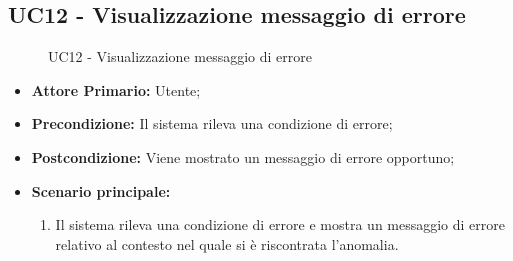 \subsection{UC12 - Visualizzazione messaggio di errore}
\begin{figure}[H]
    \centering
    \caption{UC12 - Visualizzazione messaggio di errore}
\end{figure}
\begin{itemize}
\item \textbf{Attore Primario:} Utente;
\item \textbf{Precondizione:} Il sistema rileva una condizione di errore;
\item \textbf{Postcondizione:} Viene mostrato un messaggio di errore opportuno;
\item \textbf{Scenario principale:}
    \begin{enumerate}
    \item Il sistema rileva una condizione di errore e mostra un messaggio di errore relativo al contesto nel quale si è riscontrata l'anomalia.
    \end{enumerate}
\end{itemize}